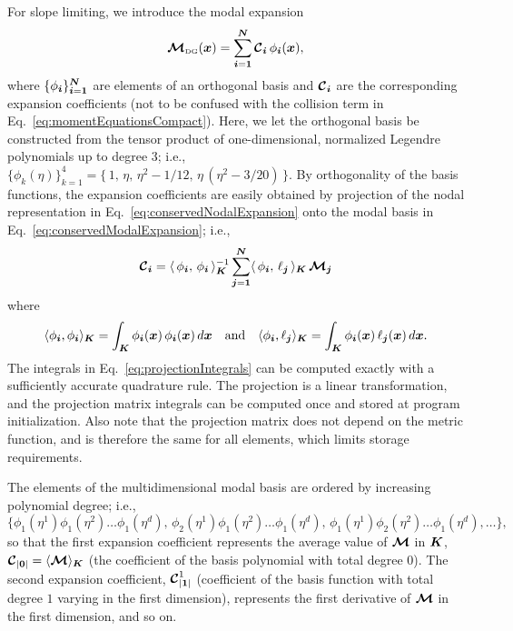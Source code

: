 \documentclass[10pt,preprint]{aastex}
\begin{document}
For slope limiting, we introduce the modal expansion
\begin{equation}
  \boldsymbol{\mathcal{M}}_{\mbox{\tiny DG}}(\boldsymbol{x})=\sum_{\boldsymbol{i}=\boldsymbol{1}}^{\boldsymbol{N}}\boldsymbol{\mathcal{C}}_{\boldsymbol{i}}\,\phi_{\boldsymbol{i}}(\boldsymbol{x}),
  \label{eq:conservedModalExpansion}
\end{equation}
where $\{\phi_{\boldsymbol{i}}\}_{\boldsymbol{i}=\boldsymbol{1}}^{\boldsymbol{N}}$ are elements of an orthogonal basis and $\boldsymbol{\mathcal{C}}_{\boldsymbol{i}}$ are the corresponding expansion coefficients (not to be confused with the collision term in Eq.~\eqref{eq:momentEquationsCompact}).  
Here, we let the orthogonal basis be constructed from the tensor product of one-dimensional, normalized Legendre polynomials up to degree 3; i.e., $\{\phi_{k}(\eta)\}_{k=1}^{4}=\{\,1,\,\eta,\,\eta^{2}-1/12,\,\eta\,(\eta^{2}-3/20)\,\}$.  
By orthogonality of the basis functions, the expansion coefficients are easily obtained by projection of the nodal representation in Eq.~\eqref{eq:conservedNodalExpansion} onto the modal basis in Eq.~\eqref{eq:conservedModalExpansion}; i.e.,
\begin{equation}
  \boldsymbol{\mathcal{C}}_{\boldsymbol{i}}
  =\langle\,\phi_{\boldsymbol{i}},\,\phi_{\boldsymbol{i}}\,\rangle_{\boldsymbol{K}}^{-1}\sum_{\boldsymbol{j}=\boldsymbol{1}}^{\boldsymbol{N}}\langle\,\phi_{\boldsymbol{i}},\,\ell_{\boldsymbol{j}}\,\rangle_{\boldsymbol{K}}\,\boldsymbol{\mathcal{M}}_{\boldsymbol{j}}
\end{equation}
where
\begin{equation}
  \langle\phi_{\boldsymbol{i}},\phi_{\boldsymbol{i}}\rangle_{\boldsymbol{K}}=\int_{\boldsymbol{K}}\phi_{\boldsymbol{i}}(\boldsymbol{x})\,\phi_{\boldsymbol{i}}(\boldsymbol{x})\,d\boldsymbol{x}
  \quad\text{and}\quad
  \langle\phi_{\boldsymbol{i}},\ell_{\boldsymbol{j}}\rangle_{\boldsymbol{K}}=\int_{\boldsymbol{K}}\phi_{\boldsymbol{i}}(\boldsymbol{x})\,\ell_{\boldsymbol{j}}(\boldsymbol{x})\,d\boldsymbol{x}.
  \label{eq:projectionIntegrals}
\end{equation}
The integrals in Eq.~\eqref{eq:projectionIntegrals} can be computed exactly with a sufficiently accurate quadrature rule.  
The projection is a linear transformation, and the projection matrix integrals can be computed once and stored at program initialization.  
Also note that the projection matrix does not depend on the metric function, and is therefore the same for all elements, which limits storage requirements.  

The elements of the multidimensional modal basis are ordered by increasing polynomial degree; i.e., 
\begin{equation}
  \{\phi_{1}(\eta^{1})\phi_{1}(\eta^{2})\ldots\phi_{1}(\eta^{d}),\,\phi_{2}(\eta^{1})\phi_{1}(\eta^{2})\ldots\phi_{1}(\eta^{d}),\,\phi_{1}(\eta^{1})\phi_{2}(\eta^{2})\ldots\phi_{1}(\eta^{d}),\ldots\},
\end{equation}
so that the first expansion coefficient represents the average value of $\boldsymbol{\mathcal{M}}$ in $\boldsymbol{K}$, $\boldsymbol{\mathcal{C}}_{|\boldsymbol{0}|}=\langle\boldsymbol{\mathcal{M}}\rangle_{\boldsymbol{K}}$ (the coefficient of the basis polynomial with total degree $0$).  
The second expansion coefficient, $\boldsymbol{\mathcal{C}}_{|\boldsymbol{1}|}^{1}$ (coefficient of the basis function with total degree $1$ varying in the first dimension), represents the first derivative of $\boldsymbol{\mathcal{M}}$ in the first dimension, and so on.  
\end{document}
